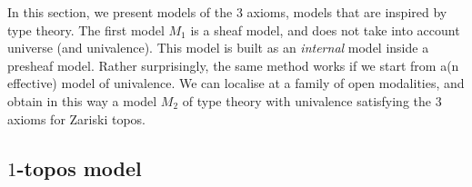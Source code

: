 \newcommand{\inc}{\mathsf{inc}}
\newcommand{\inl}{\mathsf{inl}}
\newcommand{\inr}{\mathsf{inr}}
\newcommand{\II}{\mathbf{I}}
\newcommand\norm[1]{\left\lVert #1 \right\rVert}


\newcommand{\Gm}{\mathsf{G_m}}
\newcommand{\ext}{\mathsf{ext}}
\newcommand{\patch}{\mathsf{patch}}
\newcommand{\cov}{\mathsf{cov}}
\newcommand{\isSheaf}{\mathsf{isSheaf}}
\newcommand{\Fib}{\mathsf{Fib}}

\newcommand{\Elem}{\mathsf{Elem}}
\newcommand{\Cont}{\mathsf{Cont}}

\newcommand{\BB}{\mathcal{B}}
\newcommand{\CC}{\mathcal{C}}
\newcommand{\UU}{\mathcal{U}}
\newcommand{\WW}{\mathcal{WW}}
\newcommand{\VV}{\mathcal{V}}

In this section, we present models of the 3 axioms, models that are inspired by type theory.
The first model $M_1$ 
is a sheaf model, and does not
take into account universe (and univalence). This model is built
as an {\em internal} model inside a presheaf model. Rather surprisingly, the same method
works if we start from a(n effective) model of univalence. We can localise at a family of open modalities, and  obtain
in this way a model $M_2$ of type theory with univalence satisfying the
3 axioms for Zariski topos.

\subsection{$1$-topos model}

